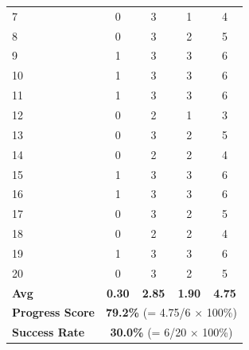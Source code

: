 \documentclass[onecolumn]{robbyant}           %
\begin{document}
\begin{table}[t]
\begin{tabular}{l|c|cc|c}
7  & 0 & 3 & 1 & 4 \\
8  & 0 & 3 & 2 & 5 \\
9  & 1 & 3 & 3 & 6 \\
10 & 1 & 3 & 3 & 6 \\
11 & 1 & 3 & 3 & 6 \\
12 & 0 & 2 & 1 & 3 \\
13 & 0 & 3 & 2 & 5 \\
14 & 0 & 2 & 2 & 4 \\
15 & 1 & 3 & 3 & 6 \\
16 & 1 & 3 & 3 & 6 \\
17 & 0 & 3 & 2 & 5 \\
18 & 0 & 2 & 2 & 4 \\
19 & 1 & 3 & 3 & 6 \\
20 & 0 & 3 & 2 & 5 \\
\midrule
\textbf{Avg} & \textbf{0.30} & \textbf{2.85} & \textbf{1.90} & \textbf{4.75} \\
\textbf{Progress Score} & \multicolumn{4}{c}{\textbf{79.2\%} (= 4.75/6 $\times$ 100\%)} \\
\textbf{Success Rate} & \multicolumn{4}{c}{\textbf{30.0\%} (= 6/20 $\times$ 100\%)} \\
\bottomrule
\end{tabular}
\end{table}
\end{document}
